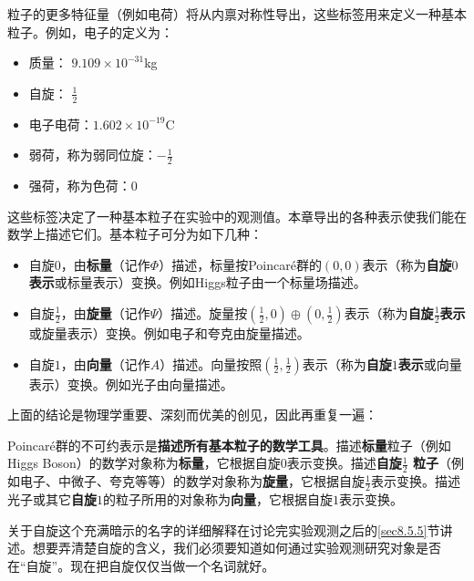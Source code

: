 粒子的更多特征量（例如电荷）将从内禀对称性导出，这些标签用来定义一种基本粒子。例如，电子的定义为：
\begin{itemize}
    \item 质量： $9.109 \times 10^{-31}$kg
    \item 自旋： $\frac{1}{2}$
    \item 电子电荷：$1.602 \times 10^{-19}$C
    \item 弱荷，称为弱同位旋：$-\frac{1}{2}$
    \item 强荷，称为色荷：$0$
\end{itemize}
这些标签决定了一种基本粒子在实验中的观测值。本章导出的各种表示使我们能在数学上描述它们。基本粒子可分为如下几种：
\begin{itemize}
    \item 自旋$0$，由{\bfseries 标量}（记作$\Phi$）描述，标量按Poincar\'e群的$(0, 0)$表示（称为{\bfseries 自旋$0$表示}或标量表示）变换。例如Higgs粒子由一个标量场描述。
    \item 自旋$\frac{1}{2}$，由{\bfseries 旋量}（记作$\Psi$）描述。旋量按$(\frac{1}{2}, 0) \oplus (0, \frac{1}{2})$表示（称为{\bfseries 自旋$\frac{1}{2}$表示}或旋量表示）变换。例如电子和夸克由旋量描述。
    \item 自旋$1$，由{\bfseries 向量}（记作$A$）描述。向量按照$(\frac{1}{2}, \frac{1}{2})$表示（称为{\bfseries 自旋$1$表示}或向量表示）变换。例如光子由向量描述。
\end{itemize}

上面的结论是物理学重要、深刻而优美的创见，因此再重复一遍：

Poincar\'e群的不可约表示是{\bfseries 描述所有基本粒子的数学工具}。描述{\bfseries 标量}粒子（例如Higgs Boson）的数学对象称为{\bfseries 标量}，它根据自旋$0$表示变换。描述{\bfseries 自旋$\frac{1}{2}$ 粒子}（例如电子、中微子、夸克等等）的数学对象称为{\bfseries 旋量}，它根据自旋$\frac{1}{2}$表示变换。描述光子或其它{\bfseries 自旋$1$}的粒子所用的对象称为{\bfseries 向量}，它根据自旋$1$表示变换。

关于自旋这个充满暗示的名字的详细解释在讨论完实验观测之后的\ref{sec8.5.5}节讲述。想要弄清楚自旋的含义，我们必须要知道如何通过实验观测研究对象是否在“自旋”。现在把自旋仅仅当做一个名词就好。

